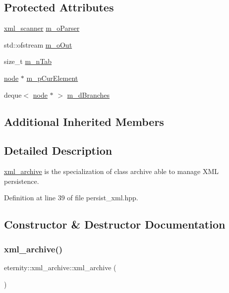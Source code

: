 \subsection*{Protected Attributes}
\begin{DoxyCompactItemize}
\item 
\hyperlink{classeternity_1_1xml__scanner}{xml\+\_\+scanner} \hyperlink{classeternity_1_1xml__archive_a58de0ad659427698ef66be97b220b541}{m\+\_\+o\+Parser}
\item 
std\+::ofstream \hyperlink{classeternity_1_1xml__archive_af41ae6859a9ff2e6ec10e3a5e283d463}{m\+\_\+o\+Out}
\item 
size\+\_\+t \hyperlink{classeternity_1_1xml__archive_ad41bc7c410f309e3036987f6ff93d34f}{m\+\_\+n\+Tab}
\item 
\hyperlink{classeternity_1_1node}{node} $\ast$ \hyperlink{classeternity_1_1xml__archive_a5b0cb5a429e2b76d4b11bfccc7b91d8d}{m\+\_\+p\+Cur\+Element}
\item 
deque$<$ \hyperlink{classeternity_1_1node}{node} $\ast$ $>$ \hyperlink{classeternity_1_1xml__archive_a6a1cf4a481b75dd3c3688e1c0ae6e2bb}{m\+\_\+d\+Branches}
\end{DoxyCompactItemize}
\subsection*{Additional Inherited Members}


\subsection{Detailed Description}
\hyperlink{classeternity_1_1xml__archive}{xml\+\_\+archive} is the specialization of class archive able to manage X\+ML persistence. 

Definition at line 39 of file persist\+\_\+xml.\+hpp.



\subsection{Constructor \& Destructor Documentation}
\mbox{\label{classeternity_1_1xml__archive_a51f29738b694efdf35486b8d6146f7c8}} 
\subsubsection{\texorpdfstring{xml\+\_\+archive()}{xml\_archive()}}
{\footnotesize\ttfamily eternity\+::xml\+\_\+archive\+::xml\+\_\+archive (\begin{DoxyParamCaption}{ }\end{DoxyParamCaption})\hspace{0.3cm}{\ttfamily [inline]}}



